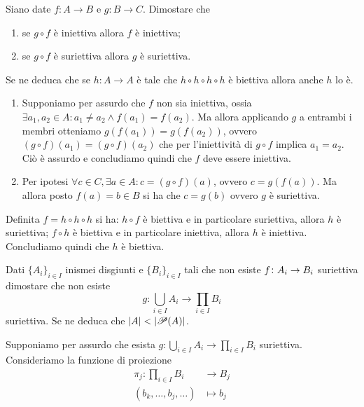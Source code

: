 \documentclass[a4paper]{article}\par \usepackage{style}\par
\begin{document}
\begin{es}
  Siano date $ f \colon A \to B $ e $ g \colon B \to C $. Dimostare che
  \begin{enumerate}
  \item se $ g \circ f $ è iniettiva allora $ f $ è iniettiva;
  \item se $ g \circ f $ è suriettiva allora $ g $ è suriettiva.
  \end{enumerate}
  Se ne deduca che se $ h \colon A \to A $ è tale che $ h \circ h \circ h \circ h $ è biettiva allora anche $ h $ lo è.
\end{es}
\begin{enumerate}
\item Supponiamo per assurdo che $ f $ non sia iniettiva, ossia $ \exists a_1, a_2 \in A : a_1 \neq a_2 \wedge f(a_1) = f(a_2) $. Ma allora applicando $ g $ a entrambi i membri otteniamo $ g(f(a_1)) = g(f(a_2)) $, ovvero $ (g \circ f)(a_1) = (g \circ f)(a_2) $ che per l'iniettività di $ g \circ f $ implica $ a_1 = a_2 $. Ciò è assurdo e concludiamo quindi che $ f $ deve essere iniettiva.
\item Per ipotesi $ \forall c \in C, \exists a \in A : c = (g \circ f)(a) $, ovvero $ c = g(f(a)) $. Ma allora posto $ f(a) = b \in B $ si ha che $ c = g(b) $ ovvero $ g $ è suriettiva.
\end{enumerate}
Definita $ f = h \circ h \circ h $ si ha: $ h \circ f $ è biettiva e in particolare suriettiva, allora $ h $ è suriettiva; $ f \circ h $ è biettiva e in particolare iniettiva, allora $ h $ è iniettiva. Concludiamo quindi che $ h $ è biettiva.\par \begin{es}
  Dati $ \{A_i\}_{i \in I} $ inismei disgiunti e $ \{B_i\}_{i \in I} $ tali che non esiste $ f \colon A_i \to \nolinebreak B_i $ suriettiva dimostare che non esiste \[g \colon \bigcup_{i \in I} A_i \to \prod_{i \in I} B_i\] suriettiva. Se ne deduca che $ |A| < |\P(A)| $.
\end{es}
Supponiamo per assurdo che esista $ g \colon \bigcup_{i \in I} A_i \to \prod_{i \in I} B_i $ suriettiva. Consideriamo la funzione di proiezione
\begin{align*}
  \pi_j \colon \prod_{i \in I}B_i & \to B_j \\
  (b_k, \dots, b_j, \dots) & \mapsto b_j
\end{align*}
\end{document}
